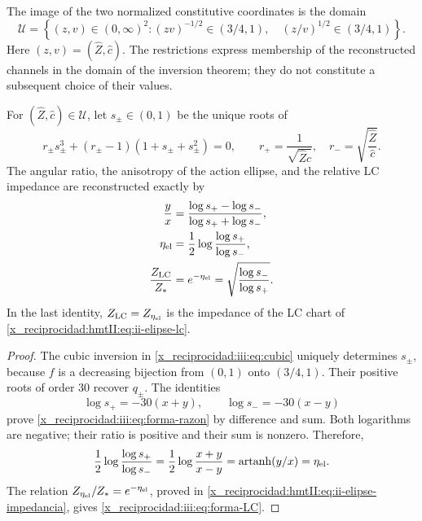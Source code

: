 The image of the two normalized constitutive coordinates is the domain
\begin{equation}
 \mathcal U=\left\{(z,v)\in(0,\infty)^2:
   (zv)^{-1/2}\in(3/4,1),\quad
   (z/v)^{1/2}\in(3/4,1)\right\}.
 \label{x_reciprocidad:iii:eq:forma-dominio}
\end{equation}
Here $(z,v)=(\widehat Z,\widehat c)$. The restrictions express
membership of the reconstructed channels in the domain of the inversion
theorem; they do not constitute a subsequent choice of their values.

\begin{proposition}
\label{x_reciprocidad:iii:prop:forma-LC}
For $(\widehat Z,\widehat c)\in\mathcal U$, let $s_\pm\in(0,1)$ be the
unique roots of
\begin{equation}
 r_\pm s_\pm^3+(r_\pm-1)(1+s_\pm+s_\pm^2)=0,
 \qquad
 r_+=\frac1{\sqrt{\widehat Z\widehat c}},\quad
 r_-=\sqrt{\frac{\widehat Z}{\widehat c}}.
 \label{x_reciprocidad:iii:eq:forma-inversion}
\end{equation}
The angular ratio, the anisotropy of the action ellipse, and the relative LC
impedance are reconstructed exactly by
\begin{align}
 \frac{y}{x}
 &=\frac{\log s_+-\log s_-}{\log s_++\log s_-},
 \label{x_reciprocidad:iii:eq:forma-razon}\\
 \eta_{\rm el}
 &=\frac12\log\frac{\log s_+}{\log s_-},
 \label{x_reciprocidad:iii:eq:forma-eta}\\
 \frac{Z_{\rm LC}}{Z_*}
 &=e^{-\eta_{\rm el}}
  =\sqrt{\frac{\log s_-}{\log s_+}}.
 \label{x_reciprocidad:iii:eq:forma-LC}
\end{align}
In the last identity, $Z_{\rm LC}=Z_{\eta_{\rm el}}$ is the impedance
of the LC chart of \eqref{x_reciprocidad:hmtII:eq:ii-elipse-lc}.
\end{proposition}
\begin{proof}
The cubic inversion in \eqref{x_reciprocidad:iii:eq:cubic} uniquely determines $s_\pm$,
because $f$ is a decreasing bijection from $(0,1)$ onto
$(3/4,1)$. Their positive roots of order $30$ recover $q_\pm$.
The identities
\[
 \log s_+=-30(x+y),\qquad \log s_-=-30(x-y)
\]
prove \eqref{x_reciprocidad:iii:eq:forma-razon} by difference and sum. Both logarithms
are negative; their ratio is positive and their sum is nonzero. Therefore,
\[
 \frac12\log\frac{\log s_+}{\log s_-}
   =\frac12\log\frac{x+y}{x-y}
   =\operatorname{artanh}(y/x)=\eta_{\rm el}.
\]
The relation $Z_{\eta_{\rm el}}/Z_*=e^{-\eta_{\rm el}}$, proved in
\eqref{x_reciprocidad:hmtII:eq:ii-elipse-impedancia}, gives \eqref{x_reciprocidad:iii:eq:forma-LC}.
\end{proof}


